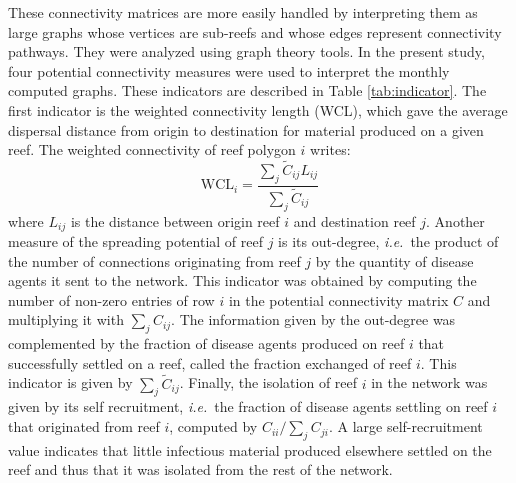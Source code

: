 \documentclass[utf8]{frontiersSCNS}
\newcommand{\ie}{{\it i.e.}\ }
\begin{document}
These connectivity matrices are more easily handled by interpreting them as large graphs whose vertices are sub-reefs and whose edges represent connectivity pathways. They were analyzed using graph theory tools. In the present study, four potential connectivity measures were used to interpret the monthly computed graphs. These indicators are described in Table \ref{tab:indicator}. The first indicator is the weighted connectivity length (WCL), which gave the average dispersal distance from origin to destination for material produced on a given reef. The weighted connectivity of reef polygon $i$ writes:
\begin{equation}
    \textrm{WCL}_i = \dfrac{\sum_j \tilde{C}_{ij} L_{ij}}{\sum_j \tilde{C}_{ij}}
\end{equation}
where $L_{ij}$ is the distance between origin reef $i$ and destination reef $j$. Another measure of the spreading potential of reef $j$ is its out-degree, \ie the product of the number of connections originating from reef $j$ by the quantity of disease agents it sent to the network. This indicator was obtained by computing the number of non-zero entries of row $i$ in the potential connectivity matrix $C$ and multiplying it with $\sum_j C_{ij}$. The information given by the out-degree was complemented by the fraction of disease agents produced on reef $i$ that successfully settled on a reef, called the fraction exchanged of reef $i$. This indicator is given by $\sum_{j} \tilde{C}_{ij}$. Finally, the isolation of reef $i$ in the network was given by its self recruitment, \ie the fraction of disease agents settling on reef $i$ that originated from reef $i$, computed by $C_{ii}/\sum_jC_{ji}$. A large self-recruitment value indicates that little infectious material produced elsewhere settled on the reef and thus that it was isolated from the rest of the network. 
\end{document}
